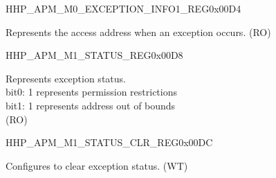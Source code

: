 \begin{register}{H}{HP\_APM\_M0\_EXCEPTION\_INFO1\_REG}{0x00D4}\label{regdesc:HPAPMM0EXCEPTIONINFO1REG}
%
\regnewline%
\begin{regdesc}\begin{reglist}
\label{fielddesc:HPAPMM0EXCEPTIONADDR}\item [HP\_APM\_M0\_EXCEPTION\_ADDR] Represents the access address when an exception occurs. (RO)
\end{reglist}\end{regdesc}
\end{register}


\begin{register}{H}{HP\_APM\_M1\_STATUS\_REG}{0x00D8}\label{regdesc:HPAPMM1STATUSREG}
%
%
\regnewline%
\begin{regdesc}\begin{reglist}
\label{fielddesc:HPAPMM1EXCEPTIONSTATUS}\item [HP\_APM\_M1\_EXCEPTION\_STATUS] Represents exception status.\\
bit0: 1 represents permission restrictions \\
bit1: 1 represents address out of bounds  \\ (RO)
\end{reglist}\end{regdesc}
\end{register}


\begin{register}{H}{HP\_APM\_M1\_STATUS\_CLR\_REG}{0x00DC}\label{regdesc:HPAPMM1STATUSCLRREG}
%
%
\regnewline%
\begin{regdesc}\begin{reglist}
\label{fielddesc:HPAPMM1EXCEPTIONSTATUSCLR}\item [HP\_APM\_M1\_EXCEPTION\_STATUS\_CLR] Configures to clear exception status. (WT)
\end{reglist}\end{regdesc}
\end{register}


